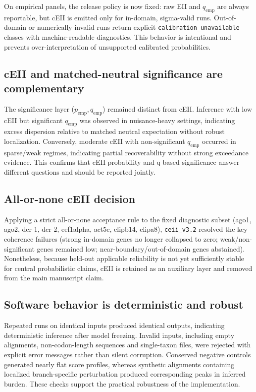 \documentclass[11pt]{article}
\begin{document}
On empirical panels, the release policy is now fixed: raw EII and $q_{\mathrm{emp}}$ are always reportable, but cEII is emitted only for in-domain, sigma-valid runs. Out-of-domain or numerically invalid runs return explicit \texttt{calibration\_unavailable} classes with machine-readable diagnostics. This behavior is intentional and prevents over-interpretation of unsupported calibrated probabilities.

\subsection{cEII and matched-neutral significance are complementary}

The significance layer ($p_{\mathrm{emp}}, q_{\mathrm{emp}}$) remained distinct from cEII. Inference with low cEII but significant $q_{\mathrm{emp}}$ was observed in nuisance-heavy settings, indicating excess dispersion relative to matched neutral expectation without robust localization. Conversely, moderate cEII with non-significant $q_{\mathrm{emp}}$ occurred in sparse/weak regimes, indicating partial recoverability without strong exceedance evidence. This confirms that cEII probability and q-based significance answer different questions and should be reported jointly.

\subsection{All-or-none cEII decision}

Applying a strict all-or-none acceptance rule to the fixed diagnostic subset (ago1, ago2, dcr-1, dcr-2, eef1alpha, act5c, clipb14, clipa8), \texttt{ceii\_v3.2} resolved the key coherence failures (strong in-domain genes no longer collapsed to zero; weak/non-significant genes remained low; near-boundary/out-of-domain genes abstained). Nonetheless, because held-out applicable reliability is not yet sufficiently stable for central probabilistic claims, cEII is retained as an auxiliary layer and removed from the main manuscript claim.

\subsection{Software behavior is deterministic and robust}

Repeated runs on identical inputs produced identical outputs, indicating deterministic inference after model freezing. Invalid inputs, including empty alignments, non-codon-length sequences and single-taxon files, were rejected with explicit error messages rather than silent corruption. Conserved negative controls generated nearly flat score profiles, whereas synthetic alignments containing localized branch-specific perturbation produced corresponding peaks in inferred burden. These checks support the practical robustness of the implementation.
\end{document}
